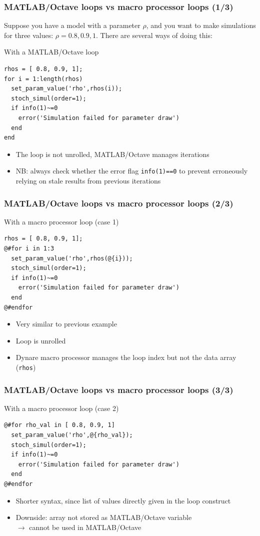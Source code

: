 \documentclass[handout,usepdftitle=false,xcolor=dvipsnames,aspectratio=169]{beamer}
\begin{document}
\begin{frame}[fragile]
  \frametitle{MATLAB/Octave loops vs macro processor loops (1/3)}
  Suppose you have a model with a parameter $\rho$, and you want to make
  simulations for three values: $\rho = 0.8, 0.9, 1$. There are
  several ways of doing this:
  \begin{block}{With a MATLAB/Octave loop}
    \small
    \begin{verbatim}
rhos = [ 0.8, 0.9, 1];
for i = 1:length(rhos)
  set_param_value('rho',rhos(i));
  stoch_simul(order=1);
  if info(1)~=0
    error('Simulation failed for parameter draw')
  end
end
\end{verbatim}
  \end{block}
  \begin{itemize}
    \item The loop is not unrolled, MATLAB/Octave manages iterations
    \item NB: always check whether the error flag \texttt{info(1)==0} to prevent erroneously relying on stale results from previous iterations
  \end{itemize}
\end{frame}

\begin{frame}[fragile]
  \frametitle{MATLAB/Octave loops vs macro processor loops (2/3)}
  \begin{block}{With a macro processor loop (case 1)}
    \small
    \begin{verbatim}
rhos = [ 0.8, 0.9, 1];
@#for i in 1:3
  set_param_value('rho',rhos(@{i}));
  stoch_simul(order=1);
  if info(1)~=0
    error('Simulation failed for parameter draw')
  end
@#endfor
\end{verbatim}
  \end{block}
  \begin{itemize}
    \item Very similar to previous example
    \item Loop is unrolled
    \item Dynare macro processor manages the loop index but not the data array (\texttt{rhos})
  \end{itemize}
\end{frame}

\begin{frame}[fragile]
  \frametitle{MATLAB/Octave loops vs macro processor loops (3/3)}
  \begin{block}{With a macro processor loop (case 2)}
    \small
    \begin{verbatim}
@#for rho_val in [ 0.8, 0.9, 1]
  set_param_value('rho',@{rho_val});
  stoch_simul(order=1);
  if info(1)~=0
    error('Simulation failed for parameter draw')
  end
@#endfor
\end{verbatim}
  \end{block}
  \begin{itemize}
    \item Shorter syntax, since list of values directly given in the loop construct
    \item Downside: array not stored as MATLAB/Octave variable\\
          $\rightarrow$ cannot be used in MATLAB/Octave
  \end{itemize}
\end{frame}
\end{document}
